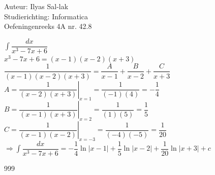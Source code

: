 \documentclass[a4paper]{article}
\newcommand{\dint}{\displaystyle\int}
\begin{document}
\noindent \large Auteur: Ilyas Sal-lak \\
\noindent \large Studierichting: Informatica\\
\noindent \large Oefeningenreeks 4A nr. 42.8\\
\medskip
\normalsize

$\dint \dfrac{dx}{x^3 - 7x + 6}$ \\

$x^3 - 7x + 6 = (x-1)(x-2)(x+3)$ \\

$\dfrac{1}{(x-1)(x-2)(x+3)} = \dfrac{A}{x-1} + \dfrac{B}{x-2} + \dfrac{C}{x+3}$ \\

$A = \left.\dfrac{1}{(x-2)(x+3)}\right|_{x=1} = \dfrac{1}{(-1)(4)} = -\dfrac{1}{4}$ \\

$B = \left.\dfrac{1}{(x-1)(x+3)}\right|_{x=2} = \dfrac{1}{(1)(5)} = \dfrac{1}{5}$ \\

$C = \left.\dfrac{1}{(x-1)(x-2)}\right|_{x=-3} = \dfrac{1}{(-4)(-5)} = \dfrac{1}{20}$ \\

$\Rightarrow \dint \dfrac{dx}{x^3-7x+6} = -\dfrac{1}{4}\ln|x-1| + \dfrac{1}{5}\ln|x-2| + \dfrac{1}{20}\ln|x+3| + c$

\begin{thebibliography}{999}
\end{thebibliography}
\end{document}
